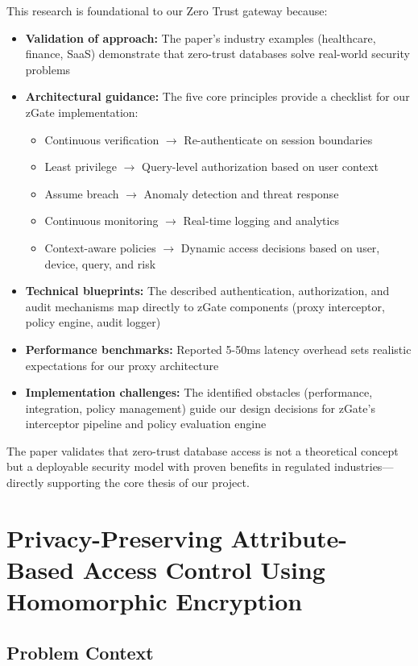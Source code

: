 This research is foundational to our Zero Trust gateway because:

\begin{itemize}
    \item \textbf{Validation of approach:} The paper's industry examples (healthcare, finance, SaaS) demonstrate that zero-trust databases solve real-world security problems
    \item \textbf{Architectural guidance:} The five core principles provide a checklist for our zGate implementation:
    \begin{itemize}
        \item Continuous verification $\rightarrow$ Re-authenticate on session boundaries
        \item Least privilege $\rightarrow$ Query-level authorization based on user context
        \item Assume breach $\rightarrow$ Anomaly detection and threat response
        \item Continuous monitoring $\rightarrow$ Real-time logging and analytics
        \item Context-aware policies $\rightarrow$ Dynamic access decisions based on user, device, query, and risk
    \end{itemize}
    \item \textbf{Technical blueprints:} The described authentication, authorization, and audit mechanisms map directly to zGate components (proxy interceptor, policy engine, audit logger)
    \item \textbf{Performance benchmarks:} Reported 5-50ms latency overhead sets realistic expectations for our proxy architecture
    \item \textbf{Implementation challenges:} The identified obstacles (performance, integration, policy management) guide our design decisions for zGate's interceptor pipeline and policy evaluation engine
\end{itemize}

The paper validates that zero-trust database access is not a theoretical concept but a deployable security model with proven benefits in regulated industries—directly supporting the core thesis of our project.

\section{Privacy-Preserving Attribute-Based Access Control Using Homomorphic Encryption}

\subsection{Problem Context}

